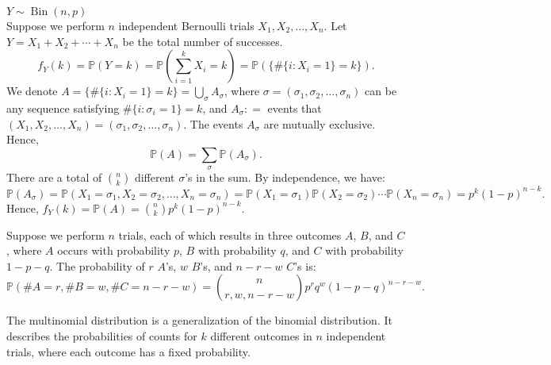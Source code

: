 \documentclass{huhtakm-template-book-v2}
\newcommand{\prob}{\mathbb{P}}
\DeclareMathOperator{\Bin}{Bin}
\begin{document}
    \begin{eg} $Y \sim \Bin(n,p)$\\
        Suppose we perform $n$ independent Bernoulli trials $X_{1},X_{2},\dots,X_{n}$. Let $Y = X_{1}+X_{2}+\cdots+X_{n}$ be the total number of successes.
        \begin{equation*}
            f_{Y}(k) = \prob(Y = k) = \prob\left(\sum_{i = 1}^{k}X_{i} = k\right) = \prob(\{\#\{i:X_{i} = 1\} = k\}).
        \end{equation*}
        We denote $A = \{\#\{i:X_{i} = 1\} = k\} = \bigcup_{\sigma}A_{\sigma}$, where $\sigma = (\sigma_{1},\sigma_{2},\dots,\sigma_{n})$ can be any sequence satisfying $\#\{i:\sigma_{i} = 1\} = k$, and $A_{\sigma}: = $ events that $(X_{1},X_{2},\dots,X_{n}) = (\sigma_{1},\sigma_{2},\dots,\sigma_{n})$. The events $A_{\sigma}$ are mutually exclusive. Hence,
        \begin{equation*}
        	\prob(A) = \sum_{\sigma}\prob(A_{\sigma}).
        \end{equation*}
        There are a total of $\binom{n}{k}$ different $\sigma$'s in the sum. By independence, we have:
        \begin{equation*}
            \prob(A_{\sigma}) = \prob(X_{1} = \sigma_{1},X_{2} = \sigma_{2},\dots,X_{n} = \sigma_{n}) = \prob(X_{1} = \sigma_{1})\prob(X_{2} = \sigma_{2})\cdots\prob(X_{n} = \sigma_{n}) = p^{k}(1-p)^{n-k}.
        \end{equation*}
        Hence, $f_{Y}(k) = \prob(A) = \binom{n}{k}p^{k}(1-p)^{n-k}$.
    \end{eg}
    \begin{eg}
        Suppose we perform $n$ trials, each of which results in three outcomes $A$, $B$, and $C$, where $A$ occurs with probability $p$, $B$ with probability $q$, and $C$ with probability $1-p-q$. The probability of $r$ $A$'s, $w$ $B$'s, and $n-r-w$ $C$'s is:
        \begin{equation*}
            \prob(\#A = r, \#B = w, \#C = n-r-w) = \binom{n}{r,w,n-r-w}p^{r}q^{w}(1-p-q)^{n-r-w}.
        \end{equation*}
    \end{eg}
    \begin{rem}
        The multinomial distribution is a generalization of the binomial distribution. It describes the probabilities of counts for $k$ different outcomes in $n$ independent trials, where each outcome has a fixed probability.
    \end{rem}
    \newpage
    
\end{document}
